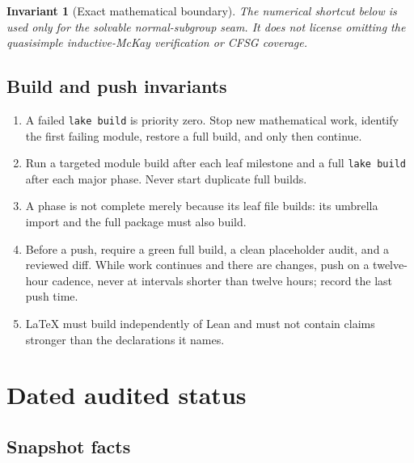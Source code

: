 \documentclass[11pt]{article}
\newtheorem{invariant}{Invariant}
\begin{document}
\begin{invariant}[Exact mathematical boundary]
The numerical shortcut below is used only for the solvable
normal-subgroup seam.  It does not license omitting the quasisimple
inductive-McKay verification or CFSG coverage.
\end{invariant}

\subsection{Build and push invariants}

\begin{enumerate}[label=\textbf{B\arabic*.},leftmargin=*]
  \item A failed \texttt{lake build} is priority zero.  Stop new
  mathematical work, identify the first failing module, restore a full
  build, and only then continue.
  \item Run a targeted module build after each leaf milestone and a full
  \texttt{lake build} after each major phase.  Never start duplicate full
  builds.
  \item A phase is not complete merely because its leaf file builds:
  its umbrella import and the full package must also build.
  \item Before a push, require a green full build, a clean placeholder
  audit, and a reviewed diff.  While work continues and there are changes,
  push on a twelve-hour cadence, never at intervals shorter than twelve
  hours; record the last push time.
  \item LaTeX must build independently of Lean and must not contain claims
  stronger than the declarations it names.
\end{enumerate}

\section{Dated audited status}

\subsection{Snapshot facts}
\end{document}
